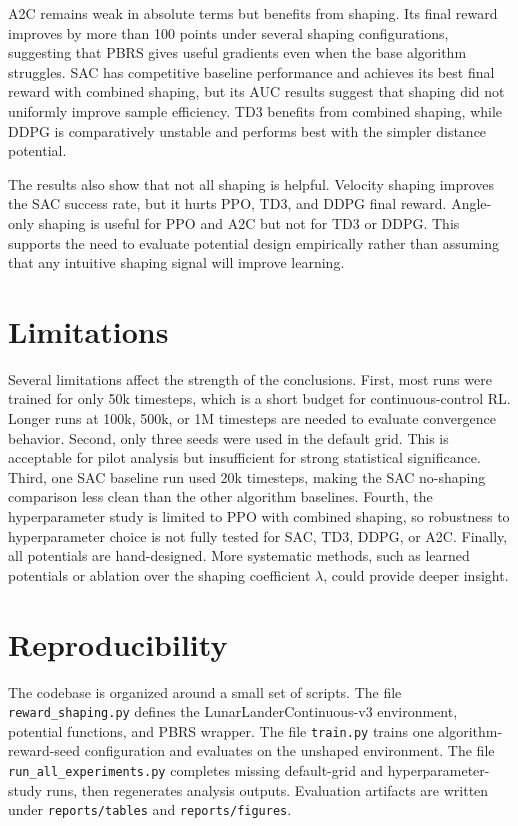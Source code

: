 \documentclass[conference,10pt]{IEEEtran}
\begin{document}
A2C remains weak in absolute terms but benefits from shaping. Its final reward improves by more than 100 points under several shaping configurations, suggesting that PBRS gives useful gradients even when the base algorithm struggles. SAC has competitive baseline performance and achieves its best final reward with combined shaping, but its AUC results suggest that shaping did not uniformly improve sample efficiency. TD3 benefits from combined shaping, while DDPG is comparatively unstable and performs best with the simpler distance potential.

The results also show that not all shaping is helpful. Velocity shaping improves the SAC success rate, but it hurts PPO, TD3, and DDPG final reward. Angle-only shaping is useful for PPO and A2C but not for TD3 or DDPG. This supports the need to evaluate potential design empirically rather than assuming that any intuitive shaping signal will improve learning.

\section{Limitations}
Several limitations affect the strength of the conclusions. First, most runs were trained for only 50k timesteps, which is a short budget for continuous-control RL. Longer runs at 100k, 500k, or 1M timesteps are needed to evaluate convergence behavior. Second, only three seeds were used in the default grid. This is acceptable for pilot analysis but insufficient for strong statistical significance. Third, one SAC baseline run used 20k timesteps, making the SAC no-shaping comparison less clean than the other algorithm baselines. Fourth, the hyperparameter study is limited to PPO with combined shaping, so robustness to hyperparameter choice is not fully tested for SAC, TD3, DDPG, or A2C. Finally, all potentials are hand-designed. More systematic methods, such as learned potentials or ablation over the shaping coefficient $\lambda$, could provide deeper insight.

\section{Reproducibility}
The codebase is organized around a small set of scripts. The file \texttt{reward\_shaping.py} defines the LunarLanderContinuous-v3 environment, potential functions, and PBRS wrapper. The file \texttt{train.py} trains one algorithm-reward-seed configuration and evaluates on the unshaped environment. The file \texttt{run\_all\_experiments.py} completes missing default-grid and hyperparameter-study runs, then regenerates analysis outputs. Evaluation artifacts are written under \texttt{reports/tables} and \texttt{reports/figures}.
\end{document}
